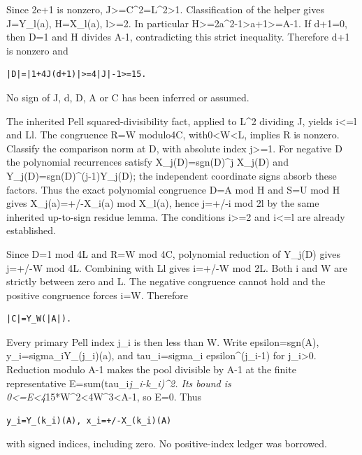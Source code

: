 Since 2e+1 is nonzero,
\textbar J\textbar\textgreater=C\^{}2=L\^{}2\textgreater1.
Classification of the helper gives \textbar J\textbar=Y\_l(a),
\textbar H\textbar=X\_l(a), l\textgreater=2. In particular
\textbar H\textbar\textgreater=2a\^{}2-1\textgreater a+1\textgreater=\textbar A-1\textbar.
If d+1=0, then D=1 and H divides A-1, contradicting this strict
inequality. Therefore d+1 is nonzero and

\begin{verbatim}
|D|=|1+4J(d+1)|>=4|J|-1>=15.
\end{verbatim}

No sign of J, d, D, A or C has been inferred or assumed.

The inherited Pell squared-divisibility fact, applied to L\^{}2 dividing
\textbar J\textbar, yields i\textless=l and L\textbar l. The congruence
R=W modulo4C, with0\textless W\textless L, implies R is nonzero.
Classify the comparison norm at \textbar D\textbar, with absolute index
j\textgreater=1. For negative D the polynomial recurrences satisfy
X\_j(D)=sgn(D)\^{}j X\_j(\textbar D\textbar) and
Y\_j(D)=sgn(D)\^{}(j-1)Y\_j(\textbar D\textbar); the independent
coordinate signs absorb these factors. Thus the exact polynomial
congruence D=A mod H and S=U mod H gives X\_j(a)=+/-X\_i(a) mod X\_l(a),
hence j=+/-i mod 2l by the same inherited up-to-sign residue lemma. The
conditions i\textgreater=2 and i\textless=l are already established.

Since D=1 mod 4L and R=W mod 4C, polynomial reduction of Y\_j(D) gives
j=+/-W mod 4L. Combining with L\textbar l gives i=+/-W mod 2L. Both i
and W are strictly between zero and L. The negative congruence cannot
hold and the positive congruence forces i=W. Therefore

\begin{verbatim}
|C|=Y_W(|A|).
\end{verbatim}

Every primary Pell index j\_i is then less than W. Write epsilon=sgn(A),
y\_i=sigma\_iY\_(j\_i)(a), and tau\_i=sigma\_i epsilon\^{}(j\_i-1) for
j\_i\textgreater0. Reduction modulo A-1 makes the pool divisible by A-1
at the finite representative E=sum(tau\_i\emph{j\_i-k\_i)\^{}2. Its
bound is
0\textless=E\textless4}15*W\^{}2\textless4W\^{}3\textless\textbar A-1\textbar,
so E=0. Thus

\begin{verbatim}
y_i=Y_(k_i)(A), x_i=+/-X_(k_i)(A)
\end{verbatim}

with signed indices, including zero. No positive-index ledger was
borrowed.


